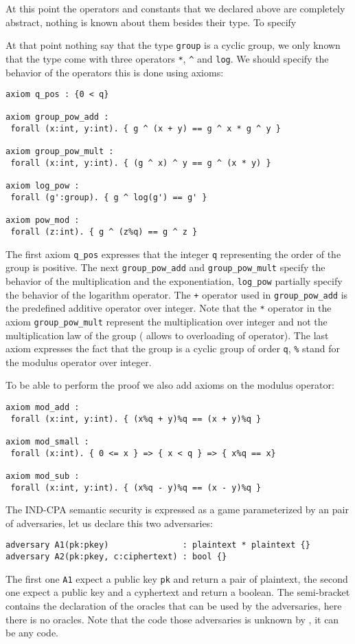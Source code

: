At this point the operators and constants that we declared above are
completely abstract, nothing is known about them besides their
type. To specify

At that point nothing say that the type \verb+group+ is a cyclic
group, we only known that the type come with three
operators \verb+*+, \verb+^+ and \verb+log+. We should specify the
behavior of the operators this is done using axioms:

\begin{verbatim}
axiom q_pos : {0 < q}

axiom group_pow_add : 
 forall (x:int, y:int). { g ^ (x + y) == g ^ x * g ^ y }

axiom group_pow_mult :
 forall (x:int, y:int). { (g ^ x) ^ y == g ^ (x * y) } 

axiom log_pow : 
 forall (g':group). { g ^ log(g') == g' }

axiom pow_mod : 
 forall (z:int). { g ^ (z%q) == g ^ z }
\end{verbatim}
      The first axiom \verb+q_pos+ expresses that the integer \verb+q+ 
      representing the order of the group is positive. 
      The next \verb+group_pow_add+ and \verb+group_pow_mult+ specify the 
      behavior of the multiplication and the exponentiation,  
      \verb+log_pow+ partially specify the behavior of the logarithm operator.
      The \verb|+| operator used in \verb+group_pow_add+ is the predefined 
      additive operator over integer. Note that the \verb+*+ operator in 
      the axiom \verb+group_pow_mult+ represent the multiplication over 
      integer and not the multiplication law of the group 
      (\easycrypt{} allows to overloading of operator). 
      The last axiom expresses the fact that the group is a cyclic group of 
      order \verb+q+, \verb+%+ stand for the modulus operator over integer.

      To be able to perform the proof we also add axioms on the modulus operator:
\begin{verbatim}
axiom mod_add : 
 forall (x:int, y:int). { (x%q + y)%q == (x + y)%q }

axiom mod_small : 
 forall (x:int). { 0 <= x } => { x < q } => { x%q == x}

axiom mod_sub : 
 forall (x:int, y:int). { (x%q - y)%q == (x - y)%q } 
\end{verbatim}

The IND-CPA semantic security is expressed as a game parameterized by an pair 
of adversaries, let us declare this two adversaries:
\begin{verbatim}
adversary A1(pk:pkey)               : plaintext * plaintext {}
adversary A2(pk:pkey, c:ciphertext) : bool {}
\end{verbatim}
The first one \verb+A1+ expect a public key \verb+pk+ and return a pair 
of plaintext, the second one expect a public key and a cyphertext and return
a boolean. The semi-bracket contains the declaration of the oracles that can
be used by the adversaries, here there is no oracles.
Note that the code those adversaries is unknown by \easycrypt,
it can be any code.

